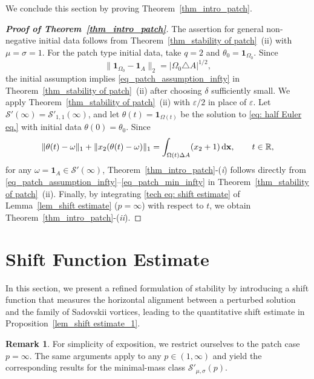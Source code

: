 \documentclass[11pt]{amsart}
\theoremstyle{definition}
\theoremstyle{definition}
\newtheorem{remark}[theorem]{Remark}
\numberwithin{equation}{section}
\newcommand{\0}{\emptyset}
\newcommand{\bfx}{{\bf x}}
\newcommand{\bbR}{\mathbb R}
\newcommand{\calS}{\mathcal S}
\newcommand{\dd}{\mathrm{d}}
\begin{document}
			We conclude this section by proving Theorem~\ref{thm_intro_patch}.
			
			\begin{proof}[\textbf{Proof of Theorem~\ref{thm_intro_patch}}]
                {
                The assertion for general non-negative initial data follows from Theorem~\ref{thm_stability of patch}~(ii) with $\mu = \sigma = 1$.
                For the patch type initial data, take $q=2$ and $\theta_0 = \mathbf{1}_{\Omega_0}$.
                Since
                \[
                \|\mathbf{1}_{\Omega_0} - \mathbf{1}_A\|_2 = |\Omega_0\triangle A|^{1/2},
                \]
                the initial assumption implies \eqref{eq_patch_assumption_infty} in Theorem~\ref{thm_stability of patch}~(ii) after choosing $\delta$ sufficiently small.
                We apply  Theorem~\ref{thm_stability of patch}~(ii) with $\varepsilon/2$ in place of $\varepsilon$.
                }
				Let $\calS'(\infty) = \calS'_{1, 1}(\infty)$, and let $\theta(t) = \mathbf{1}_{\Omega(t)}$ be the solution to \eqref{eq: half Euler eq.} with initial data $\theta(0) = \theta_0$.
				Since
				\[
				\| \theta(t) - \omega\|_1 + \|x_2(\theta(t) - \omega)\|_1 = \int_{\Omega(t) \Delta A} (x_2 + 1) \, \dd \bfx, \qquad  t \in \bbR,
				\]
				for any $\omega = \mathbf{1}_A \in \calS'(\infty)$, Theorem~\ref{thm_intro_patch}-(\textit{i}) follows directly from \eqref{eq_patch_assumption_infty}--\eqref{eq_patch_min_infty} in Theorem~\ref{thm_stability of patch}~(ii).
				Finally, by integrating \eqref{tech eq: shift estimate} of Lemma~\ref{lem_shift estimate} ($p = \infty$) with respect to $t$, we obtain Theorem~\ref{thm_intro_patch}-(\textit{ii}).
			\end{proof}
			
			
			\appendix
			
			\section{Shift Function Estimate}\label{app_shift}
			In this section, we present a refined formulation of stability by introducing a shift function that measures the horizontal alignment between a perturbed solution and the family of Sadovskii vortices, leading to the quantitative shift estimate in Proposition~\ref{lem_shift estimate_1}.
			
			\begin{remark}
				For simplicity of exposition, we restrict ourselves to the patch case $p=\infty$.
				The same arguments apply to any $p\in(1,\infty)$ and yield the corresponding results for the minimal-mass class $\calS'_{\mu,\sigma}(p)$.
			\end{remark}
			
\end{document}
